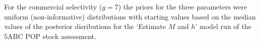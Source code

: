 \documentclass[11pt]{article}   %
\def\AppLet{E}                   %
\def\gcomm{7}                    %
\def\headc{\vspace{-1ex}} %
\def\subsub#1{\noindent {\bf #1} \headc}    %
\def\vsd{\vspace*{1ex}}     %
\begin{document}
For the commercial selectivity ($g=\gcomm$) the priors for the three parameters were uniform (non-informative) distributions with starting values based on the median values of the posterior disributions for the `Estimate $M$ and $h$' model run of the 5ABC POP stock assessment. 





%

\vsd
\vsd   %
\end{document}
